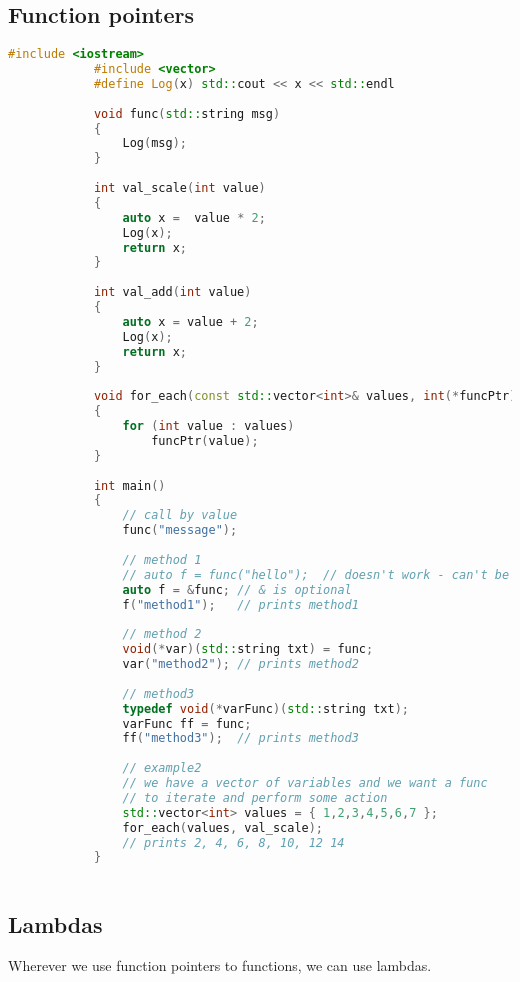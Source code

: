 \documentclass{article}
\begin{document}
    \subsection{Function pointers}
        \begin{lstlisting}[language=C++, caption=function pointers example]
            #include <iostream>
            #include <vector>
            #define Log(x) std::cout << x << std::endl
            
            void func(std::string msg)
            {
            	Log(msg);
            }
            
            int val_scale(int value)
            {
            	auto x =  value * 2;
            	Log(x);
            	return x;
            }
            
            int val_add(int value)
            {
            	auto x = value + 2;
            	Log(x);
            	return x;
            }
            
            void for_each(const std::vector<int>& values, int(*funcPtr)(int))
            {
            	for (int value : values)
            		funcPtr(value);
            }
            
            int main()
            {
            	// call by value
            	func("message");
            
            	// method 1
            	// auto f = func("hello");	// doesn't work - can't be of type void
            	auto f = &func; // & is optional
            	f("method1");	// prints method1
            
            	// method 2
            	void(*var)(std::string txt) = func;
            	var("method2");	// prints method2
            
            	// method3
            	typedef void(*varFunc)(std::string txt);
            	varFunc ff = func;
            	ff("method3");	// prints method3
            
            	// example2
            	// we have a vector of variables and we want a func 
            	// to iterate and perform some action
            	std::vector<int> values = { 1,2,3,4,5,6,7 };
            	for_each(values, val_scale);
            	// prints 2, 4, 6, 8, 10, 12 14
            }
            
        \end{lstlisting}
    
    \subsection{Lambdas}
        Wherever we use function pointers to functions, we can use lambdas. 
        
\end{document}
